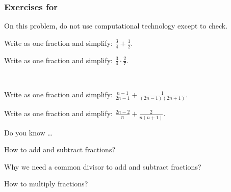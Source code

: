 
\subsubsection*{Exercises for 
\subfracalg}

\begin{exer}[\exerP] %
\label{exer_add_sub_fractions}
    On this problem, do not use computational technology except to check.
        \begin{exerpart}
            \item Write as one fraction and simplify: $\displaystyle \frac{3}{4} + \frac{1}{2}$.
            \item Write as one fraction and simplify: $\displaystyle \frac{3}{4} \cdot \frac{2}{7}$.
        \end{exerpart}
\end{exer}

\begin{exer}[\exerU] %
\label{exer_add_sub_fractions_withn}
~
    \begin{exerpart}
        \item Write as one fraction and simplify: $\displaystyle \frac{n-1}{2n-1}+\frac{1}{(2n-1)(2n+1)}$.
        \item Write as one fraction and simplify: $\displaystyle \frac{2n-2}{n}+\frac{2}{n(n+1)}$.
    \end{exerpart}
\end{exer}

\begin{exer}[\exerR] %
\label{exer_dyk_fraction_arith}
    Do you know \ldots
        \begin{exerpart}
            \item How to add and subtract fractions?
            \item Why we need a common divisor to add and subtract fractions?
            \item How to multiply fractions?
        \end{exerpart}
\end{exer}

\subsection{\answers}

